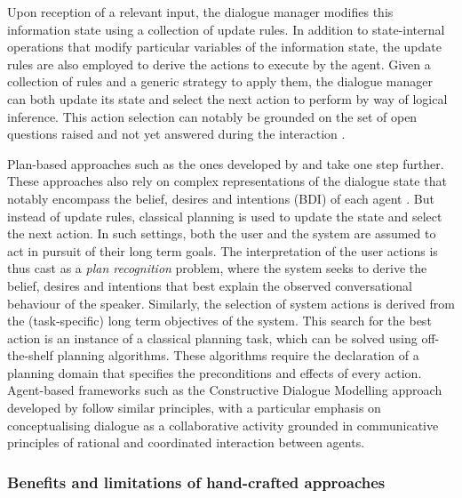 Upon reception of a relevant input, the dialogue manager modifies this information state using a collection of update rules. In addition to state-internal operations that modify particular variables of the information state, the update rules are also employed to derive the actions to execute by the agent.  Given a collection of rules and a generic strategy to apply them, the dialogue manager can both update its state and select the next action to perform by way of logical inference. This action selection can notably be grounded on the set of open questions raised and not yet answered during the interaction \citep{larsson2002,Ginzburg2012}.  

Plan-based approaches such as the ones developed by \cite{Freedman:2000} and \cite{Allen:2001} take one step further. These approaches also rely on complex representations of the dialogue state that notably encompass the belief, desires and intentions (BDI) of each agent \citep{Cohen1979,Allen1980}.  But instead of update rules, classical planning is used to update the state and select the next action.  In such settings, both the user and the system are assumed to act in pursuit of their long term goals.  The interpretation of the user actions is thus cast as a \textit{plan recognition} problem, where the system seeks to derive the belief, desires and intentions that best explain the observed conversational behaviour of the speaker.  Similarly, the selection of system actions is derived from the (task-specific) long term objectives of the system. This search for the best action is an instance of a classical planning task, which can be solved using off-the-shelf planning algorithms. These algorithms require the declaration of a planning domain that specifies the preconditions and effects of every action. Agent-based frameworks such as the Constructive Dialogue Modelling approach developed by \cite{Jokinen:2009} follow similar principles, with a particular emphasis on conceptualising dialogue as a collaborative activity grounded in communicative principles of rational and coordinated interaction between agents. 

\subsubsection*{Benefits and limitations of hand-crafted approaches}


